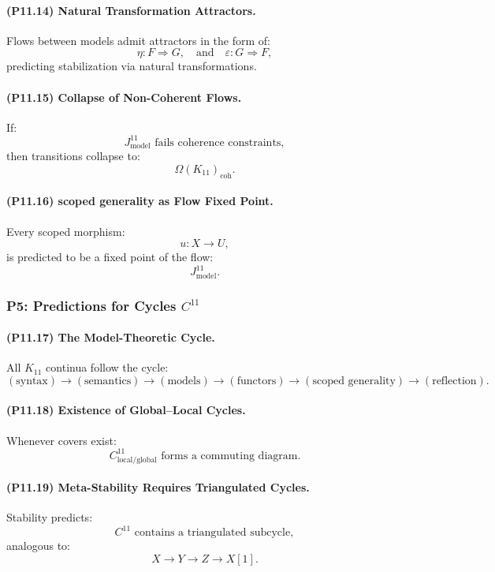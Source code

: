 \paragraph{(P11.14) Natural Transformation Attractors.}
Flows between models admit attractors in the form of:
\[
\eta: F \Rightarrow G,
\quad\text{and}\quad
\varepsilon: G \Rightarrow F,
\]
predicting stabilization via natural transformations.

\paragraph{(P11.15) Collapse of Non-Coherent Flows.}
If:
\[
J_{\mathrm{model}}^{11}
\text{ fails coherence constraints},
\]
then transitions collapse to:
\[
\Omega(K_{11})_{\mathrm{coh}}.
\]

\paragraph{(P11.16) scoped generality as Flow Fixed Point.}
Every scoped morphism:
\[
u: X \to U,
\]
is predicted to be a fixed point of the flow:
\[
J_{\mathrm{model}}^{11}.
\]

\subsubsection{P5: Predictions for Cycles $C^{11}$}

\paragraph{(P11.17) The Model-Theoretic Cycle.}
All $K_{11}$ continua follow the cycle:
\[
(\text{syntax}) \to (\text{semantics}) 
\to (\text{models}) \to (\text{functors})
\to (\text{scoped generality}) \to (\text{reflection}).
\]

\paragraph{(P11.18) Existence of Global–Local Cycles.}
Whenever covers exist:
\[
C_{\mathrm{local/global}}^{11}
\text{ forms a commuting diagram.}
\]

\paragraph{(P11.19) Meta-Stability Requires Triangulated Cycles.}
Stability predicts:
\[
C^{11} \text{ contains a triangulated subcycle},
\]
analogous to:
\[
X \to Y \to Z \to X[1].
\]

